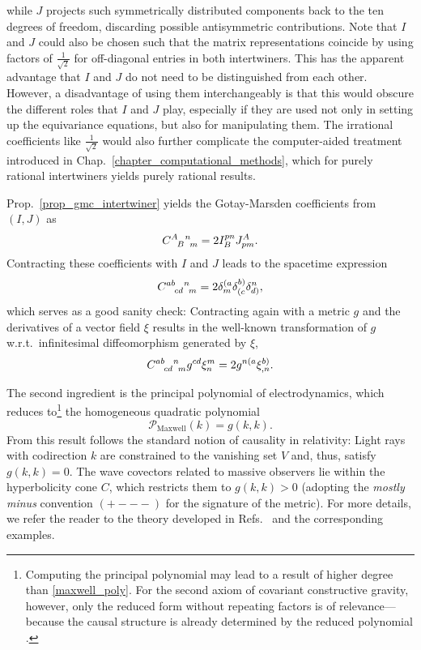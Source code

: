 while $J$ projects such symmetrically distributed components back to the ten degrees of freedom, discarding possible antisymmetric contributions. Note that $I$ and $J$ could also be chosen such that the matrix representations coincide by using factors of $\frac{1}{\sqrt 2}$ for off-diagonal entries in both intertwiners. This has the apparent advantage that $I$ and $J$ do not need to be distinguished from each other. However, a disadvantage of using them interchangeably is that this would obscure the different roles that $I$ and $J$ play, especially if they are used not only in setting up the equivariance equations, but also for manipulating them. The irrational coefficients like $\frac{1}{\sqrt 2}$ would also further complicate the computer-aided treatment introduced in Chap.\ \ref{chapter_computational_methods}, which for purely rational intertwiners yields purely rational results.

Prop.\ \ref{prop_gmc_intertwiner} yields the Gotay-Marsden coefficients from $(I,J)$ as
\begin{equation}\label{gmc_metric}
  \gmc{A}{B}{n}{m} = 2 I^{pn}_B J^A_{pm}.
\end{equation}
Contracting these coefficients with $I$ and $J$ leads to the spacetime expression
\begin{equation}
  \gmc{ab}{cd}{n}{m} = 2 \delta^{(a}_m \delta^{b)}_{(c} \delta^n_{d)},
\end{equation}
which serves as a good sanity check: Contracting again with a metric $g$ and the derivatives of a vector field $\xi$ results in the well-known transformation of $g$ w.r.t.\ infinitesimal diffeomorphism generated by $\xi$,
\begin{equation}
  \gmc{ab}{cd}{n}{m} g^{cd} \xi^m_n = 2g^{n(a} \xi^{b)}_{,n}.
\end{equation}

The second ingredient is the principal polynomial of electrodynamics, which reduces to\footnote{Computing the principal polynomial may lead to a result of higher degree than \eqref{maxwell_poly}. For the second axiom of covariant constructive gravity, however, only the reduced form without repeating factors is of relevance---because the causal structure is already determined by the reduced polynomial \cite{R_tzel_2011}.} the homogeneous quadratic polynomial \cite{R_tzel_2011}
\begin{equation}\label{maxwell_poly}
  \mathcal P_\text{Maxwell}(k) = g(k,k).
\end{equation}
From this result follows the standard notion of causality in relativity: Light rays with codirection $k$ are constrained to the vanishing set $V$ and, thus, satisfy $g(k,k)=0$. The wave covectors related to massive observers lie within the hyperbolicity cone $C$, which restricts them to $g(k,k) > 0$ (adopting the \emph{mostly minus} convention $(+---)$ for the signature of the metric). For more details, we refer the reader to the theory developed in Refs.\ \cite{R_tzel_2011,Rivera_2012,Giesel_2012,D_ll_2018} and the corresponding examples.

